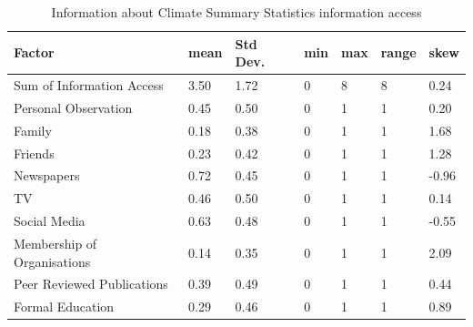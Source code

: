 \begin{center}
\begin{table}[H]
    \centering
    \begin{tabular}{|l|l|l|l|l|l|l|}
    \hline
        \textbf{Factor} & \textbf{mean} & \textbf{Std Dev}. & \textbf{ min} & \textbf{max} & \textbf{ range} & \textbf{skew}  \\ \hline
        
      Sum of Information Access & 3.50 & 1.72 & 0 & 8 & 8 & 0.24 \\ \hline
        Personal Observation  & 0.45 & 0.50 & 0 & 1 & 1 & 0.20 \\ \hline
        Family & 0.18 & 0.38 & 0 & 1 & 1 & 1.68  \\ \hline
        Friends & 0.23 & 0.42 & 0 & 1 & 1 & 1.28  \\ \hline
        Newspapers & 0.72 & 0.45 & 0 & 1 & 1 & -0.96 \\ \hline
        TV & 0.46 & 0.50 & 0 & 1 & 1 & 0.14 \\ \hline
        Social Media & 0.63 & 0.48 & 0 & 1 & 1 & -0.55 \\ \hline
        Membership of Organisations & 0.14 & 0.35 & 0 & 1 & 1 & 2.09 \\ \hline
       Peer Reviewed Publications & 0.39 & 0.49 & 0 & 1 & 1 & 0.44 \\ \hline
        Formal Education & 0.29 & 0.46 & 0 & 1 & 1 & 0.89 \\ \hline
        
         \end{tabular}
    \caption{Information about Climate Summary Statistics information access}
\label{table:sum_stats_info_climate_access}
\end{table}
\end{center}


